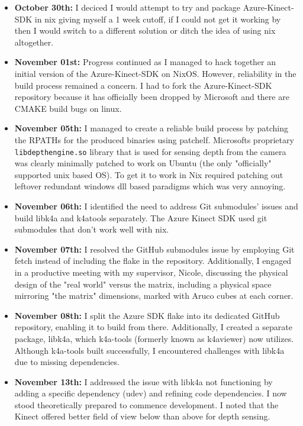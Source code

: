 \begin{itemize}
    \item \textbf{October 30th:} I deciced I would attempt to try and package Azure-Kinect-SDK in nix giving myself a 1 week cutoff, if I could not get it working by then I would switch to a different solution or ditch the idea of using nix altogether.

    \item \textbf{November 01st:} Progress continued as I managed to hack together an initial version of the Azure-Kinect-SDK on NixOS. However, reliability in the build process remained a concern. I had to fork the Azure-Kinect-SDK repository because it has officially been dropped by Microsoft and there are CMAKE build bugs on linux.

    \item \textbf{November 05th:} I managed to create a reliable build process by patching the RPATHs for the produced binaries using patchelf. Microsofts proprietary \texttt{libdepthengine.so} library that is used for sensing depth from the camera was clearly minimally patched to work on Ubuntu (the only "officially" supported unix based OS). To get it to work in Nix required patching out leftover redundant windows dll based paradigms which was very annoying.

    \item \textbf{November 06th:} I identified the need to address Git submodules' issues and build libk4a and k4atools separately. The Azure Kinect SDK used git submodules that don't work well with nix.

    \item \textbf{November 07th:} I resolved the GitHub submodules issue by employing Git fetch instead of including the flake in the repository. Additionally, I engaged in a productive meeting with my supervisor, Nicole, discussing the physical design of the "real world" versus the matrix, including a physical space mirroring "the matrix" dimensions, marked with Aruco cubes at each corner.

    \item \textbf{November 08th:} I split the Azure SDK flake into its dedicated GitHub repository, enabling it to build from there. Additionally, I created a separate package, libk4a, which k4a-tools (formerly known as k4aviewer) now utilizes. Although k4a-tools built successfully, I encountered challenges with libk4a due to missing dependencies.

    \item \textbf{November 13th:} I addressed the issue with libk4a not functioning by adding a specific dependency (udev) and refining code dependencies. I now stood theoretically prepared to commence development. I noted that the Kinect offered better field of view below than above for depth sensing.


\end{itemize}
